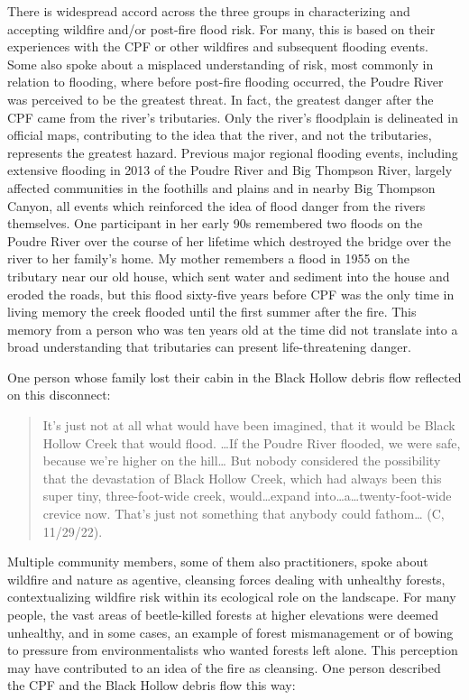 \documentclass[
]{article}
\begin{document}
There is widespread accord across the three groups in characterizing and accepting wildfire and/or post-fire flood risk. For many, this is based on their experiences with the CPF or other wildfires and subsequent flooding events. Some also spoke about a misplaced understanding of risk, most commonly in relation to flooding, where before post-fire flooding occurred, the Poudre River was perceived to be the greatest threat. In fact, the greatest danger after the CPF came from the river's tributaries. Only the river's floodplain is delineated in official maps, contributing to the idea that the river, and not the tributaries, represents the greatest hazard. Previous major regional flooding events, including extensive flooding in 2013 of the Poudre River and Big Thompson River, largely affected communities in the foothills and plains and in nearby Big Thompson Canyon, all events which reinforced the idea of flood danger from the rivers themselves. One participant in her early 90s remembered two floods on the Poudre River over the course of her lifetime which destroyed the bridge over the river to her family's home. My mother remembers a flood in 1955 on the tributary near our old house, which sent water and sediment into the house and eroded the roads, but this flood sixty-five years before CPF was the only time in living memory the creek flooded until the first summer after the fire. This memory from a person who was ten years old at the time did not translate into a broad understanding that tributaries can present life-threatening danger.

One person whose family lost their cabin in the Black Hollow debris flow reflected on this disconnect:

\begin{quote}
It's just not at all what would have been imagined, that it would be Black Hollow Creek that would flood. \ldots If the Poudre River flooded, we were safe, because we're higher on the hill\ldots{} But nobody considered the possibility that the devastation of Black Hollow Creek, which had always been this super tiny, three-foot-wide creek, would\ldots expand into\ldots a\ldots twenty-foot-wide crevice now. That's just not something that anybody could fathom\ldots{} (C, 11/29/22).
\end{quote}

Multiple community members, some of them also practitioners, spoke about wildfire and nature as agentive, cleansing forces dealing with unhealthy forests, contextualizing wildfire risk within its ecological role on the landscape. For many people, the vast areas of beetle-killed forests at higher elevations were deemed unhealthy, and in some cases, an example of forest mismanagement or of bowing to pressure from environmentalists who wanted forests left alone. This perception may have contributed to an idea of the fire as cleansing. One person described the CPF and the Black Hollow debris flow this way:
\end{document}
